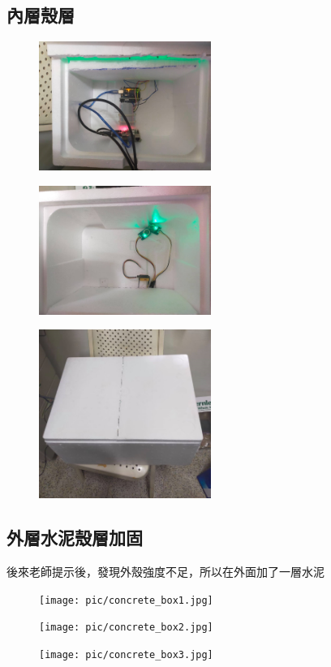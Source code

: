 	\subsection{內層殼層}
		\begin{figure}[H]
			\centering
			\includegraphics[width=0.5\textwidth]{pic/box(1).jpg}
		\end{figure}
		\begin{figure}[H]
			\centering
			\includegraphics[width=0.5\textwidth]{pic/box(2).jpg}
		\end{figure}
		\begin{figure}[H]
			\centering
			\includegraphics[width=0.5\textwidth]{pic/box(3).jpg}
		\end{figure}
	\subsection{外層水泥殼層加固}
		後來老師提示後，發現外殼強度不足，所以在外面加了一層水泥
		\begin{figure}[H]
			\centering
			\texttt{[image: pic/concrete\_box1.jpg]}
		\end{figure}
		\begin{figure}[H]
			\centering
			\texttt{[image: pic/concrete\_box2.jpg]}
		\end{figure}
		\begin{figure}[H]
			\centering
			\texttt{[image: pic/concrete\_box3.jpg]}
		\end{figure}